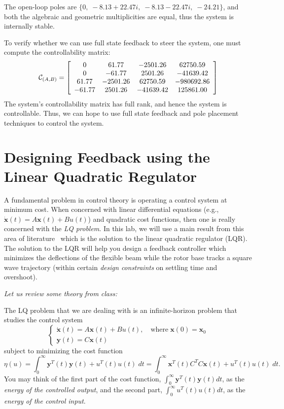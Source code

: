 The open-loop poles are $\{0,\; -8.13+22.47i,\; -8.13-22.47i,\; -24.21\}$, and both the algebraic and geometric multiplicities are equal, thus the system is internally stable.

To verify whether we can use full state feedback to steer the system, one must compute the controllability matrix:
\[
    \mathcal{C}_{(A,B)} = \left[\begin{array}{c c c c}
            0      & 61.77    & -2501.26  & 62750.59   \\
            0      & -61.77   & 2501.26   & -41639.42  \\
            61.77  & -2501.26 & 62750.59  & -980692.86 \\
            -61.77 & 2501.26  & -41639.42 & 125861.00
        \end{array}\right]
\]
The system's controllability matrix has full rank, and hence the system is controllable. Thus, we can hope to use full state feedback and pole placement techniques to control the system.

\section{Designing Feedback using the Linear Quadratic Regulator}\label{section:lab4_lqr}
A fundamental problem in control theory is operating a control system at minimum cost. When concerned with linear differential equations (e.g., $\mathbf{\dot{x}}(t) = A\mathbf{x}(t) + Bu(t)$) and quadratic cost functions, then one is really concerned with the \emph{LQ problem}. In this lab, we will use a main result from this area of literature~\cite{kwakernaak1972linear} which is the solution to the linear quadratic regulator (LQR). The solution to the LQR will help you design a feedback controller which minimizes the deflections of the flexible beam while the rotor base tracks a square wave trajectory (within certain \emph{design constraints} on settling time and overshoot).

\noindent \emph{Let us review some theory from class:}

The LQ problem that we are dealing with is an infinite-horizon problem that studies the control system
\[
    \begin{cases}
        \dot{\mathbf{x}}(t) = A\mathbf{x}(t)+Bu(t), \quad \text{where} \; \mathbf{x}(0) = \mathbf{x}_0 \\
        \mathbf{y}(t) = C \mathbf{x}(t)
    \end{cases}
\]
subject to minimizing the cost function
\[
    \eta(u) = \int_0^{\infty} \mathbf{y}^T(t)\mathbf{y}(t) + u^T(t)u(t) \; dt = \int_0^\infty  \mathbf{x}^T(t) C^T C \mathbf{x}(t) + u^T(t)u(t) \; dt.
\]
You may think of the first part of the cost function, $ \int_0^{\infty} \mathbf{y}^T(t)\mathbf{y}(t) dt$, as the \emph{energy of the controlled output}, and the second part, $\int_0^{\infty} u^T(t)u(t) dt$, as the \emph{energy of the control input}.

